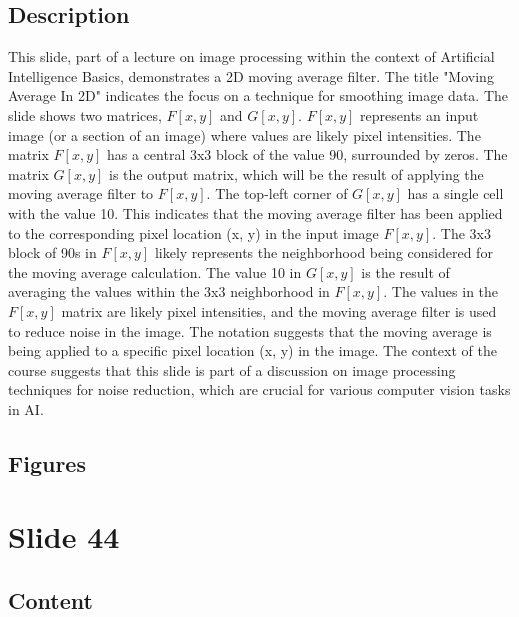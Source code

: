 \documentclass{article}%
\begin{document}
\subsection{Description}%
This slide, part of a lecture on image processing within the context of Artificial Intelligence Basics, demonstrates a 2D moving average filter.  The title "Moving Average In 2D" indicates the focus on a technique for smoothing image data.  The slide shows two matrices, $F[x, y]$ and $G[x, y]$.  $F[x, y]$ represents an input image (or a section of an image) where values are likely pixel intensities.  The matrix $F[x, y]$ has a central 3x3 block of the value 90, surrounded by zeros.  The matrix $G[x, y]$ is the output matrix, which will be the result of applying the moving average filter to $F[x, y]$.  The top-left corner of $G[x, y]$ has a single cell with the value 10.  This indicates that the moving average filter has been applied to the corresponding pixel location (x, y) in the input image $F[x, y]$.  The 3x3 block of 90s in $F[x, y]$ likely represents the neighborhood being considered for the moving average calculation.  The value 10 in $G[x, y]$ is the result of averaging the values within the 3x3 neighborhood in $F[x, y]$.  The values in the $F[x, y]$ matrix are likely pixel intensities, and the moving average filter is used to reduce noise in the image.  The notation suggests that the moving average is being applied to a specific pixel location (x, y) in the image. The context of the course suggests that this slide is part of a discussion on image processing techniques for noise reduction, which are crucial for various computer vision tasks in AI.%
\subsection{Figures}%
\begin{figure}[H]%
\centering%
\end{figure}

%
\newpage%
\section{Slide 44}%
\label{sec:Slide44}%
\subsection{Content}%
%
\end{document}
